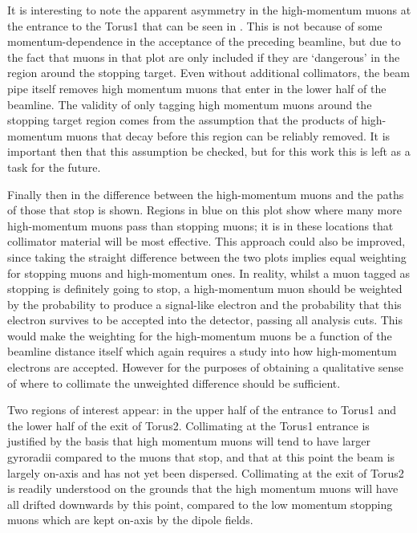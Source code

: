 It is interesting to note the apparent asymmetry in the high-momentum muons at the entrance to the Torus1 that can be seen in .  
This is not because of some momentum-dependence in the acceptance of the preceding beamline, but due to the fact that muons in that plot are only included if they are `dangerous' in the region around the stopping target.
Even without additional collimators, the beam pipe itself removes high momentum muons that enter in the lower half of the beamline.
The validity of only tagging high momentum muons around the stopping target region comes from the assumption that the products of high-momentum muons that decay before this region can be reliably removed.
It is important then that this assumption be checked, but for this work this is left as a task for the future.

Finally then in  the difference between the high-momentum muons and the paths of those that stop is shown. 
Regions in blue on this plot show where many more high-momentum muons pass than stopping muons; it is in these locations that collimator material will be most effective.
This approach could also be improved, since taking the straight difference between the two plots implies equal weighting for stopping muons and high-momentum ones.
In reality, whilst a muon tagged as stopping is definitely going to stop, a high-momentum muon should be weighted by the probability to produce a signal-like electron and the probability that this electron survives to be accepted into the detector, passing all analysis cuts.
This would make the weighting for the high-momentum muons be a function of the beamline distance itself which again requires a study into how high-momentum electrons are accepted.
However for the purposes of obtaining a qualitative sense of where to collimate the unweighted difference should be sufficient.

Two regions of interest appear: in the upper half of the entrance to Torus1 and the lower half of the exit of Torus2.  
Collimating at the Torus1 entrance is justified by the basis that high momentum muons will tend to have larger gyroradii compared to the muons that stop, and that at this point the beam is largely on-axis and has not yet been dispersed.
Collimating at the exit of Torus2 is readily understood on the grounds that the high momentum muons will have all drifted downwards by this point, compared to the low momentum stopping muons which are kept on-axis by the dipole fields.

